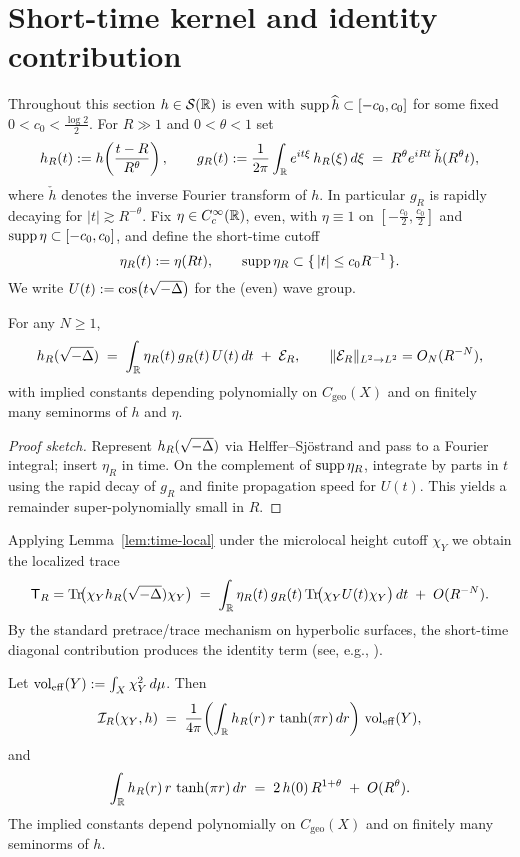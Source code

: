\section{Short-time kernel and identity contribution}\label{sec:kernel}

Throughout this section $h\in\mathcal{S}(\mathbb{R})$ is even with
$\operatorname{supp} \widehat{h}\subset[-c_0,c_0]$ for some fixed $0<c_0<\tfrac{\log 2}{2}$.
For $R\gg1$ and $0<\theta<1$ set
\[
  h_R(t):=h\!\left(\frac{t-R}{R^\theta}\right),\qquad
  g_R(t):=\frac{1}{2\pi}\int_{\mathbb{R}}e^{it\xi}\,h_R(\xi)\,d\xi
  \;=\;R^\theta e^{iRt}\,\check h(R^\theta t),
\]
where $\check h$ denotes the inverse Fourier transform of $h$. In particular
$g_R$ is rapidly decaying for $|t|\gtrsim R^{-\theta}$.
Fix $\eta\in C_c^\infty(\mathbb{R})$, even, with $\eta\equiv1$ on
$[-\tfrac{c_0}{2},\tfrac{c_0}{2}]$ and $\operatorname{supp}\eta\subset[-c_0,c_0]$, and define the
short-time cutoff
\[
  \eta_R(t):=\eta(Rt),
  \qquad \operatorname{supp} \eta_R \subset \{\,|t|\le c_0 R^{-1}\,\}.
\]
We write $U(t):=\cos\!\big(t\sqrt{-\Delta}\big)$ for the (even) wave group.

\begin{lemma}\label{lem:time-local}
For any $N\ge1$,
\[
  h_R(\sqrt{-\Delta})
  \;=\;\int_{\mathbb{R}} \eta_R(t)\, g_R(t)\, U(t)\,dt \;+\; \mathcal{E}_R,
  \qquad \|\mathcal{E}_R\|_{L^2\to L^2}=O_N(R^{-N}),
\]
with implied constants depending polynomially on $C_{\mathrm{geo}}(X)$ and on
finitely many seminorms of $h$ and $\eta$.
\end{lemma}

\begin{proof}[Proof sketch]
Represent $h_R(\sqrt{-\Delta})$ via Helffer--Sj\"ostrand and pass to a Fourier
integral; insert $\eta_R$ in time. On the complement of $\operatorname{supp}\eta_R$, integrate
by parts in $t$ using the rapid decay of $g_R$ and finite propagation speed for
$U(t)$. This yields a remainder super-polynomially small in $R$.
\end{proof}

Applying Lemma~\ref{lem:time-local} under the microlocal height cutoff $\chi_Y$ we
obtain the localized trace
\[
  \mathsf{T}_R=\mathrm{Tr}\!\big(\chi_Y h_R(\sqrt{-\Delta}) \chi_Y\big)
  \;=\; \int_{\mathbb{R}}\eta_R(t)\, g_R(t)\, \mathrm{Tr}\!\big(\chi_Y U(t)\chi_Y\big)\,dt
  \;+\; O(R^{-N}).
\]
By the standard pretrace/trace mechanism on hyperbolic surfaces, the short-time
diagonal contribution produces the identity term
(see, e.g., \cite{hejhal1976,hejhal1983}).

\begin{proposition}\label{prop:identity}
Let $\operatorname{vol}_{\mathrm{eff}}(Y):=\int_X \chi_Y^2\,d\mu$. Then
\[
  \mathcal{I}_R(\chi_Y,h)
  \;=\; \frac{1}{4\pi}\!\left(\int_{\mathbb{R}} h_R(r)\, r\,\tanh(\pi r)\,dr\right)\,
        \operatorname{vol}_{\mathrm{eff}}(Y),
\]
and
\[
  \int_{\mathbb{R}} h_R(r)\, r\,\tanh(\pi r)\,dr
  \;=\; 2\,h(0)\,R^{1+\theta} \;+\; O(R^\theta).
\]
The implied constants depend polynomially on $C_{\mathrm{geo}}(X)$ and on finitely
many seminorms of $h$.
\end{proposition}

